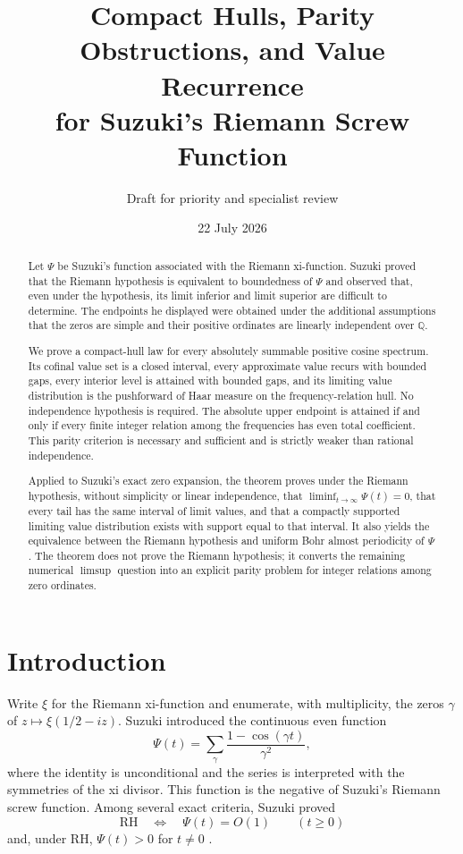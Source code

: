 \documentclass[11pt]{article}
\title{Compact Hulls, Parity Obstructions, and Value Recurrence\\
for Suzuki's Riemann Screw Function}
\author{Draft for priority and specialist review}
\date{22 July 2026}
\theoremstyle{remark}
\begin{document}
\maketitle

\begin{abstract}
Let $\Psi$ be Suzuki's function associated with the Riemann xi-function.  Suzuki proved that the
Riemann hypothesis is equivalent to boundedness of $\Psi$ and observed that, even under the
hypothesis, its limit inferior and limit superior are difficult to determine.  The endpoints he
displayed were obtained under the additional assumptions that the zeros are simple and their
positive ordinates are linearly independent over $\mathbb Q$.

We prove a compact-hull law for every absolutely summable positive cosine spectrum.  Its cofinal
value set is a closed interval, every approximate value recurs with bounded gaps, every interior
level is attained with bounded gaps, and its limiting value distribution is the pushforward of Haar
measure on the frequency-relation hull.  No independence hypothesis is required.  The absolute
upper endpoint is attained if and only if every finite integer relation among the frequencies has
even total coefficient.  This parity criterion is necessary and sufficient and is strictly weaker
than rational independence.

Applied to Suzuki's exact zero expansion, the theorem proves under the Riemann hypothesis, without
simplicity or linear independence, that $\liminf_{t\to\infty}\Psi(t)=0$, that every tail has the
same interval of limit values, and that a compactly supported limiting value distribution exists
with support equal to that interval.  It also yields the equivalence between the Riemann hypothesis
and uniform Bohr almost periodicity of $\Psi$.  The theorem does not prove the Riemann hypothesis;
it converts the remaining numerical $\limsup$ question into an explicit parity problem for integer
relations among zero ordinates.
\end{abstract}

\section{Introduction}

Write $\xi$ for the Riemann xi-function and enumerate, with multiplicity, the zeros $\gamma$ of
$z\mapsto\xi(1/2-iz)$.  Suzuki introduced the continuous even function
\begin{equation}\label{eq:suzuki-series}
  \Psi(t)=\sum_{\gamma}\frac{1-\cos(\gamma t)}{\gamma^2},
\end{equation}
where the identity is unconditional and the series is interpreted with the symmetries of the xi
divisor.  This function is the negative of Suzuki's Riemann screw function.  Among several exact
criteria, Suzuki proved
\begin{equation}\label{eq:suzuki-boundedness}
  \mathrm{RH}\quad\Longleftrightarrow\quad \Psi(t)=O(1)
  \qquad (t\geq 0)
\end{equation}
and, under RH, $\Psi(t)>0$ for $t\ne0$ \cite{Suzuki2023}.
\end{document}
